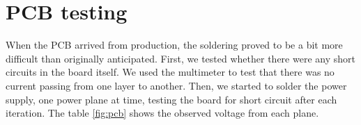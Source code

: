 \section {PCB testing}



When the \ac{PCB} arrived from production, the soldering proved
to be a bit more difficult than originally anticipated.
First, we tested whether
there were any short circuits in the board itself. We used the multimeter to test that
there was no current passing from one layer to another. Then, we started to solder the power supply, one power plane at time, testing the board for short
circuit after each iteration. The table \ref{fig:pcb} shows the observed voltage from each plane.




